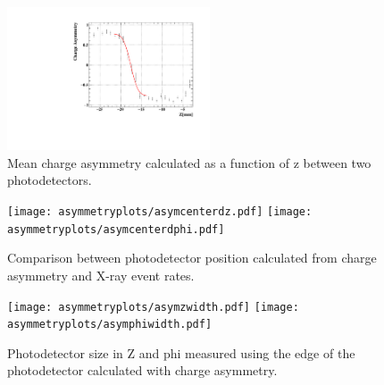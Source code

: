 \begin{figure}
\centering
\includegraphics[width=6cm]{graphics/nnasym6465.pdf}
\caption{Mean charge asymmetry calculated as a function of z between 
two photodetectors.}
\label{fig:asymplot} 
\end{figure}

\begin{figure}
\centering
\texttt{[image: asymmetryplots/asymcenterdz.pdf]}
\texttt{[image: asymmetryplots/asymcenterdphi.pdf]}
\caption{Comparison between photodetector position calculated from
charge asymmetry and X-ray event rates.}
\label{fig:asymvsfit} 
\end{figure}




\begin{figure}
\centering
\texttt{[image: asymmetryplots/asymzwidth.pdf]}
\texttt{[image: asymmetryplots/asymphiwidth.pdf]}
\caption{Photodetector size in Z and phi measured using the edge of the
photodetector calculated with charge asymmetry.}
\label{fig:mppcsize} 
\end{figure}

